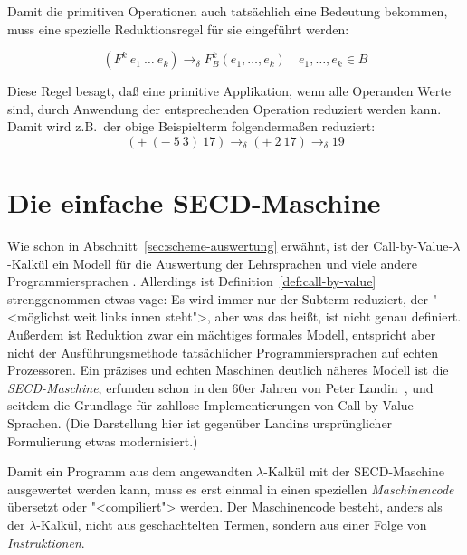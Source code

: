 Damit die primitiven Operationen auch tatsächlich eine Bedeutung
bekommen, muss eine spezielle Reduktionsregel für sie eingeführt
werden:
%
\begin{definition}
\begin{displaymath}
  (F^k~e_1~\ldots~e_k) \rightarrow_{\delta} F_B^k(e_1, \ldots, e_k)
  \quad e_1, \ldots, e_k \in B
\end{displaymath}
\end{definition}
%
Diese Regel besagt, daß eine primitive Applikation, wenn alle
Operanden Werte sind, durch Anwendung der entsprechenden Operation 
reduziert werden kann.  Damit wird z.B.\ der
obige Beispielterm folgendermaßen reduziert:
%
\begin{displaymath}
  (+~(-~5~3)~17) \rightarrow_{\delta} (+~2~17) \rightarrow_{\delta} 19
\end{displaymath}

\section{Die einfache SECD-Maschine}

Wie schon in Abschnitt~\ref{sec:scheme-auswertung} erwähnt, ist 
der Call-by-Value-$\lambda$-Kalkül
ein Modell für die Auswertung der Lehrsprachen und viele andere
Programmiersprachen .
Allerdings ist Definition~\ref{def:call-by-value} strenggenommen etwas
vage: Es wird immer nur der Subterm reduziert, der
"<möglichst weit links innen steht">, aber was das heißt, ist nicht
genau definiert.  Außerdem ist Reduktion zwar ein
mächtiges formales Modell, entspricht aber nicht der
Ausführungsmethode tatsächlicher Programmiersprachen auf echten
Prozessoren.  Ein präzises und echten Maschinen deutlich näheres
Modell ist die \textit{SECD-Maschine}, erfunden
schon in den 60er Jahren von Peter Landin~\cite{Landin1964}, und
seitdem die Grundlage für zahllose Implementierungen von
Call-by-Value-Sprachen.  (Die Darstellung hier ist gegenüber Landins
ursprünglicher Formulierung etwas modernisiert.)

Damit ein Programm aus dem angewandten $\lambda$-Kalkül mit der
SECD-Maschine ausgewertet werden kann, muss es erst einmal in einen
speziellen \textit{Maschinencode} übersetzt oder
"<compiliert"> werden.  Der Maschinencode besteht, anders als der
$\lambda$-Kalkül, nicht aus geschachtelten Termen, sondern aus einer
Folge von \textit{Instruktionen}.  


